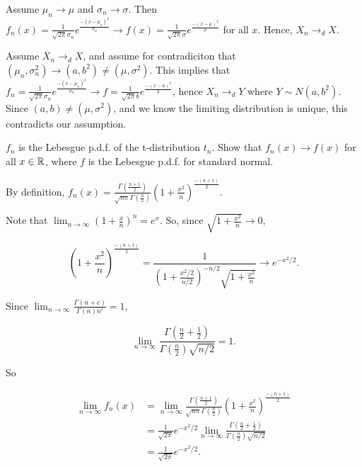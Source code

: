\documentclass[]{book}
\theoremstyle{definition}
\theoremstyle{definition}
\theoremstyle{definition}
\theoremstyle{remark}
\let\BeginKnitrBlock\begin \let\EndKnitrBlock\end
\begin{document}
\BeginKnitrBlock{solution}
\iffalse{} {Solution. } \fi{}Assume \(\mu_n \to \mu\) and
\(\sigma_n \to \sigma\). Then
\(f_n(x) = \frac{1}{\sqrt{2\pi}\sigma_n}e^{\tfrac{-(x-\mu_n)^2}{\sigma_n}} \to f(x) = \frac{1}{\sqrt{2\pi}\sigma}e^{\tfrac{-(x-\mu)^2}{\sigma}}\)
for all \(x\). Hence, \(X_n \to_d X\).

Assume \(X_n \to_d X\), and assume for contradiciton that
\((\mu_n, \sigma^2_n) \to (a,b^2) \neq (\mu, \sigma^2)\). This implies
that
\(f_n = \frac{1}{\sqrt{2\pi}\sigma_n}e^{\tfrac{-(x-\mu_n)^2}{\sigma_n}} \to f = \frac{1}{\sqrt{2\pi}b}e^{\tfrac{-(x-a)^2}{b}}\),
hence \(X_n \to_d Y\) where \(Y \sim N(a,b^2)\). Since
\((a,b) \neq (\mu, \sigma^2)\), and we know the limiting distribution is
unique, this contradicts our assumption.
\EndKnitrBlock{solution}

\BeginKnitrBlock{exercise}[Ex 142]
\protect\hypertarget{exr:unnamed-chunk-69}{}{\label{exr:unnamed-chunk-69}
\iffalse (Ex 142) \fi{} }\(f_n\) is the Lebesgue p.d.f. of the
t-distribution \(t_n\). Show that \(f_n(x) \rightarrow f(x)\) for all
\(x \in \mathbb{R}\), where \(f\) is the Lebesgue p.d.f. for standard normal.
\EndKnitrBlock{exercise}

\BeginKnitrBlock{solution}
\iffalse{} {Solution. } \fi{}By definition,
\(f_n(x) = \frac{\Gamma(\tfrac{n+1}{2})}{\sqrt{n\pi} \Gamma(\tfrac{n}{2})}\left(1 + \frac{x^2}{n}\right)^{\tfrac{-(n+1)}{2}}\).

Note that
\(\lim_{n \rightarrow \infty}\left(1+\frac{x}{n}\right)^n = e^x\). So,
since \(\sqrt{1+\tfrac{x^2}{n}} \rightarrow 0\),

\[\left(1 + \frac{x^2}{n}\right)^{\tfrac{-(n+1)}{2}} = \frac{1}{\left(1+\tfrac{x^2/2}{n/2}\right)^{-n/2}\sqrt{1+\tfrac{x^2}{n}}} \rightarrow e^{-x^2/2}.\]

Since
\(\lim_{n \rightarrow \infty} \frac{\Gamma(n + c)}{\Gamma(n)n^c} = 1\),

\[\lim_{n \rightarrow \infty} \frac{\Gamma(\tfrac{n}{2} + \tfrac{1}{2})}{\Gamma(\tfrac{n}{2})\sqrt{n/2}} = 1.\]

So

\[\begin{aligned}
  \lim_{n \rightarrow \infty} f_n(x) &= \lim_{n\rightarrow \infty} \frac{\Gamma(\tfrac{n+1}{2})}{\sqrt{n\pi} \Gamma(\tfrac{n}{2})}\left(1 + \frac{x^2}{n}\right)^{\tfrac{-(n+1)}{2}} \\
                                     &= \frac{1}{\sqrt{2\pi}}e^{-x^2/2}\lim_{n\rightarrow \infty}\frac{\Gamma(\tfrac{n}{2} + \tfrac{1}{2})}{\Gamma(\tfrac{n}{2})\sqrt{n/2}} \\
                                     &= \frac{1}{\sqrt{2\pi}}e^{-x^2/2}.
\end{aligned}\]
\EndKnitrBlock{solution}
\end{document}
